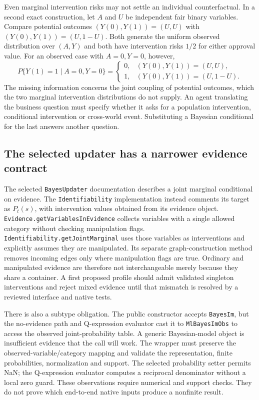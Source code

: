 Even marginal intervention risks may not settle an individual counterfactual.
In a second exact construction, let $A$ and $U$ be independent fair binary
variables. Compare potential outcomes $(Y(0),Y(1))=(U,U)$ with
$(Y(0),Y(1))=(U,1-U)$. Both generate the uniform observed distribution over
$(A,Y)$ and both have intervention risks $1/2$ for either approval value. For
an observed case with $A=0,Y=0$, however,
\begin{equation}
 P\{Y(1)=1\mid A=0,Y=0\}=
 \begin{cases}0,&(Y(0),Y(1))=(U,U),\\
 1,&(Y(0),Y(1))=(U,1-U).
 \end{cases}
 \label{exec19:javaid-coupling}
\end{equation}
The missing information concerns the joint coupling of potential outcomes,
which the two marginal intervention distributions do not supply. An agent
translating the business question must specify whether it asks for a population
intervention, conditional intervention or cross-world event. Substituting a
Bayesian conditional for the last answers another question.
\citep{exec19_javaid_reference}

\subsection{The selected updater has a narrower evidence contract}
\label{exec19:javaid-evidence}

The selected \texttt{BayesUpdater} documentation describes a joint marginal
conditional on evidence. The \texttt{Identifiability} implementation instead
comments its target as $P_t(s)$, with intervention values obtained from its
evidence object. \texttt{Evidence.getVariablesInEvidence} collects variables
with a single allowed category without checking manipulation flags.
\texttt{Identifiability.getJointMarginal} uses those variables as interventions
and explicitly assumes they are manipulated. Its separate graph-construction
method removes incoming edges only where manipulation flags are true.
Ordinary and manipulated evidence are therefore not interchangeable merely
because they share a container. A first proposed profile should admit validated
singleton interventions and reject mixed evidence until that mismatch is
resolved by a reviewed interface and native tests.~\citep{exec19_javaid_source}

There is also a subtype obligation. The public constructor accepts
\texttt{BayesIm}, but the no-evidence path and Q-expression evaluator cast it
to \texttt{MlBayesImObs} to access the observed joint-probability table. A
generic Bayesian-model object is insufficient evidence that the call will work.
The wrapper must preserve the observed-variable/category mapping and validate
the representation, finite probabilities, normalization and support. The
selected probability setter permits NaN; the Q-expression evaluator computes
a reciprocal denominator without a local zero guard. These observations
require numerical and support checks. They do not prove which end-to-end
native inputs produce a nonfinite result.~\citep{exec19_javaid_source}

